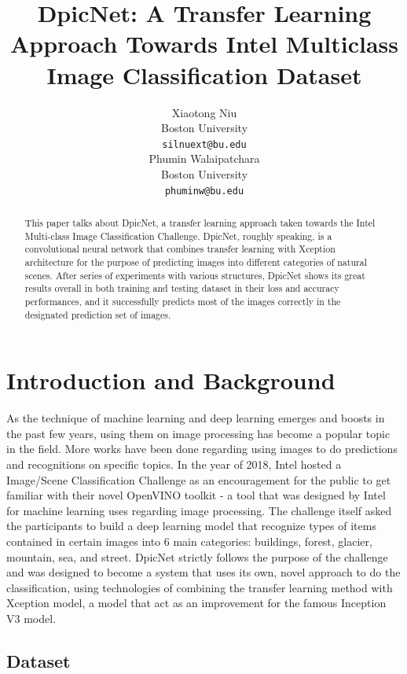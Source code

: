 \documentclass{article}
\title{DpicNet: A Transfer Learning Approach Towards Intel Multiclass Image Classification Dataset}
\author{%
  Xiaotong Niu \\
  Boston University\\
  \texttt{silnuext@bu.edu} \\
  \And
  Phumin Walaipatchara \\
  Boston University\\
  \texttt{phuminw@bu.edu} \\
}
\begin{document}
\maketitle

\begin{abstract}
  This paper talks about DpicNet, a transfer learning approach taken towards the Intel Multi-class Image Classification Challenge. DpicNet, roughly speaking, is a convolutional neural network that combines transfer learning with Xception architecture for the purpose of predicting images into different categories of natural scenes. After series of experiments with various structures, DpicNet shows its great results overall in both training and testing dataset in their loss and accuracy performances, and it successfully predicts most of the images correctly in the designated prediction set of images.
\end{abstract}


\section{Introduction and Background}

As the technique of machine learning and deep learning emerges and boosts in the past few years, using them on image processing has become a popular topic in the field. More works have been done regarding using images to do predictions and recognitions on specific topics. In the year of 2018, Intel hosted a Image/Scene Classification Challenge as an encouragement for the public to get familiar with their novel OpenVINO toolkit - a tool that was designed by Intel for machine learning uses regarding image processing. The challenge itself asked the participants to build a deep learning model that recognize types of items contained in certain images into 6 main categories: buildings, forest, glacier, mountain, sea, and street. DpicNet strictly follows the purpose of the challenge and was designed to become a system that uses its own, novel approach to do the classification, using technologies of combining the transfer learning method with Xception model, a model that act as an improvement for the famous Inception V3 model.

\subsection{Dataset}
\end{document}
